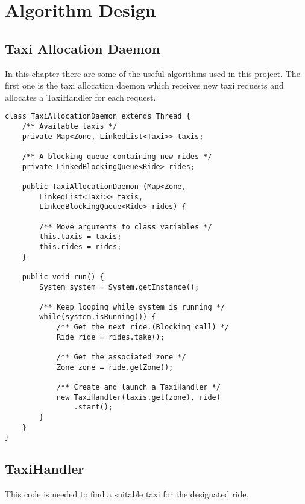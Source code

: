 \pagebreak
\section{Algorithm Design}

\subsection{Taxi Allocation Daemon}
In this chapter there are some of the useful algorithms used in this project.
The first one is the taxi allocation daemon which receives 
new taxi requests and allocates a TaxiHandler for each request.

\lstset{
language=Java,
numbersep=10pt,
numbers=left,
frame=single,
}
\begin{lstlisting}[caption={Taxi allocation daemon}]
class TaxiAllocationDaemon extends Thread {
    /** Available taxis */
    private Map<Zone, LinkedList<Taxi>> taxis;

    /** A blocking queue containing new rides */
    private LinkedBlockingQueue<Ride> rides;

    public TaxiAllocationDaemon (Map<Zone, 
        LinkedList<Taxi>> taxis, 
        LinkedBlockingQueue<Ride> rides) {

        /** Move arguments to class variables */
        this.taxis = taxis;
        this.rides = rides;
    }

    public void run() {
        System system = System.getInstance();

        /** Keep looping while system is running */
        while(system.isRunning()) {
            /** Get the next ride.(Blocking call) */
            Ride ride = rides.take();

            /** Get the associated zone */
            Zone zone = ride.getZone();

            /** Create and launch a TaxiHandler */
            new TaxiHandler(taxis.get(zone), ride)
                .start(); 
        }
    }
}
\end{lstlisting}
\pagebreak

\subsection{TaxiHandler}
This code is needed to find a suitable taxi for the designated ride.

